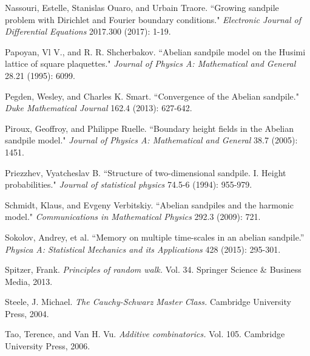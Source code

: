 \documentclass[a4paper, 12pt, notitlepage]{amsart}
\theoremstyle{remark}
\begin{document}
\begin{thebibliography}{1}
Nassouri, Estelle, Stanislas Ouaro, and Urbain Traore. 
\newblock ``Growing sandpile problem with Dirichlet and Fourier boundary conditions." 
\newblock \emph{Electronic Journal of Differential Equations} 2017.300 (2017): 1-19.

Papoyan, Vl V., and R. R. Shcherbakov. 
\newblock ``Abelian sandpile model on the Husimi lattice of square plaquettes." 
\newblock \emph{Journal of Physics A: Mathematical and General} 28.21 (1995): 6099.

Pegden, Wesley, and Charles K. Smart. 
\newblock ``Convergence of the Abelian sandpile."
\newblock \emph{Duke Mathematical Journal} 162.4 (2013): 627-642.

Piroux, Geoffroy, and Philippe Ruelle. 
\newblock ``Boundary height fields in the Abelian sandpile model."
\newblock \emph{Journal of Physics A: Mathematical and General} 38.7 (2005): 1451.

Priezzhev, Vyatcheslav B. 
\newblock ``Structure of two-dimensional sandpile. I. Height probabilities." 
\newblock \emph{Journal of statistical physics} 74.5-6 (1994): 955-979.

Schmidt, Klaus, and Evgeny Verbitskiy. 
\newblock ``Abelian sandpiles and the harmonic model."
\newblock \emph{Communications in Mathematical Physics} 292.3 (2009): 721.


Sokolov, Andrey, et al. 
\newblock ``Memory on multiple time-scales in an abelian sandpile.'' 
\newblock \emph{Physica A: Statistical Mechanics and its Applications} 428 (2015): 295-301.

Spitzer, Frank. 
\newblock \emph{Principles of random walk.} 
\newblock Vol. 34. Springer Science \& Business Media, 2013.

Steele, J. Michael. 
\newblock \emph{The Cauchy-Schwarz Master Class.} Cambridge University Press, 2004.

Tao, Terence, and Van H. Vu. 
\newblock \emph{Additive combinatorics.} Vol. 105. Cambridge University Press, 2006.

\end{thebibliography}
\end{document}
